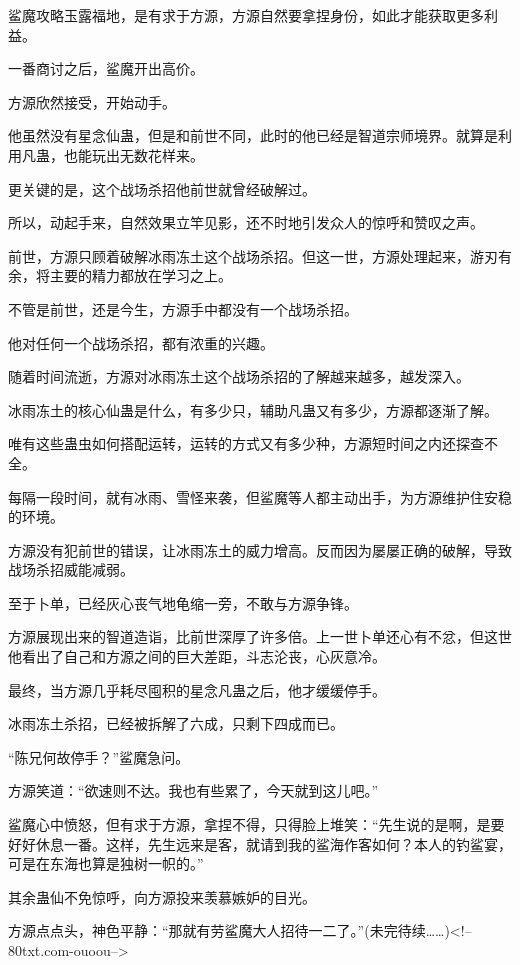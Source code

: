 \begin{this_body}
鲨魔攻略玉露福地，是有求于方源，方源自然要拿捏身份，如此才能获取更多利益。

一番商讨之后，鲨魔开出高价。

方源欣然接受，开始动手。

他虽然没有星念仙蛊，但是和前世不同，此时的他已经是智道宗师境界。就算是利用凡蛊，也能玩出无数花样来。

更关键的是，这个战场杀招他前世就曾经破解过。

所以，动起手来，自然效果立竿见影，还不时地引发众人的惊呼和赞叹之声。

前世，方源只顾着破解冰雨冻土这个战场杀招。但这一世，方源处理起来，游刃有余，将主要的精力都放在学习之上。

不管是前世，还是今生，方源手中都没有一个战场杀招。

他对任何一个战场杀招，都有浓重的兴趣。

随着时间流逝，方源对冰雨冻土这个战场杀招的了解越来越多，越发深入。

冰雨冻土的核心仙蛊是什么，有多少只，辅助凡蛊又有多少，方源都逐渐了解。

唯有这些蛊虫如何搭配运转，运转的方式又有多少种，方源短时间之内还探查不全。

每隔一段时间，就有冰雨、雪怪来袭，但鲨魔等人都主动出手，为方源维护住安稳的环境。

方源没有犯前世的错误，让冰雨冻土的威力增高。反而因为屡屡正确的破解，导致战场杀招威能减弱。

至于卜单，已经灰心丧气地龟缩一旁，不敢与方源争锋。

方源展现出来的智道造诣，比前世深厚了许多倍。上一世卜单还心有不忿，但这世他看出了自己和方源之间的巨大差距，斗志沦丧，心灰意冷。

最终，当方源几乎耗尽囤积的星念凡蛊之后，他才缓缓停手。

冰雨冻土杀招，已经被拆解了六成，只剩下四成而已。

“陈兄何故停手？”鲨魔急问。

方源笑道：“欲速则不达。我也有些累了，今天就到这儿吧。”

鲨魔心中愤怒，但有求于方源，拿捏不得，只得脸上堆笑：“先生说的是啊，是要好好休息一番。这样，先生远来是客，就请到我的鲨海作客如何？本人的钓鲨宴，可是在东海也算是独树一帜的。”

其余蛊仙不免惊呼，向方源投来羡慕嫉妒的目光。

方源点点头，神色平静：“那就有劳鲨魔大人招待一二了。”(未完待续……)<!--80txt.com-ouoou-->

\end{this_body}

